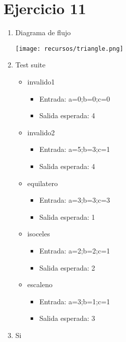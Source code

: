 \documentclass{article}
\begin{document}
\section*{Ejercicio 11}

\begin{enumerate}
    \item Diagrama de flujo
    
    \texttt{[image: recursos/triangle.png]}

    \item Test suite
        \begin{itemize}
            \item invalido1
                \begin{itemize}
                    \item Entrada: a=0;b=0;c=0
                    \item Salida esperada: 4
                \end{itemize}
            \item invalido2
                \begin{itemize}
                    \item Entrada: a=5;b=3;c=1
                    \item Salida esperada: 4
                \end{itemize}
            \item equilatero
                \begin{itemize}
                    \item Entrada: a=3;b=3;c=3
                    \item Salida esperada: 1
                \end{itemize}
            \item isoceles
                \begin{itemize}
                    \item Entrada: a=2;b=2;c=1
                    \item Salida esperada: 2
                \end{itemize}
            \item escaleno
                \begin{itemize}
                    \item Entrada: a=3;b=1;c=1
                    \item Salida esperada: 3
                \end{itemize}
        \end{itemize}
    \item Si
\end{enumerate}
\end{document}
